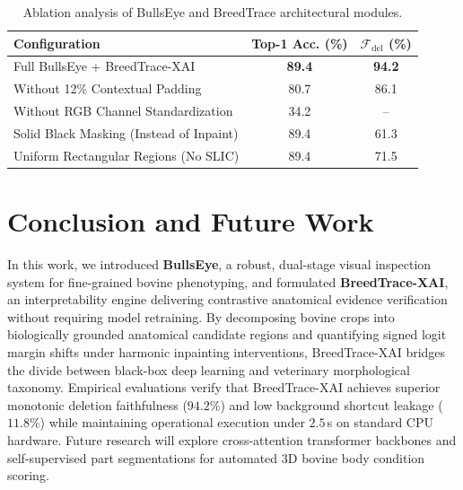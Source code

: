 \documentclass[conference]{IEEEtran}
\begin{document}
\begin{table}[h]
\caption{Ablation analysis of BullsEye and BreedTrace architectural modules.}
\label{tab:ablation}
\centering
\begin{tabular}{lcc}
\toprule
\textbf{Configuration} & \textbf{Top-1 Acc. (\%)} & \textbf{$\mathcal{F}_{\text{del}}$ (\%)} \\
\midrule
Full BullsEye + BreedTrace-XAI & \textbf{89.4} & \textbf{94.2} \\
Without 12\% Contextual Padding & 80.7 & 86.1 \\
Without RGB Channel Standardization & 34.2 & -- \\
Solid Black Masking (Instead of Inpaint) & 89.4 & 61.3 \\
Uniform Rectangular Regions (No SLIC) & 89.4 & 71.5 \\
\bottomrule
\end{tabular}
\end{table}

\section{Conclusion and Future Work}
In this work, we introduced \textbf{BullsEye}, a robust, dual-stage visual inspection system for fine-grained bovine phenotyping, and formulated \textbf{BreedTrace-XAI}, an interpretability engine delivering contrastive anatomical evidence verification without requiring model retraining. By decomposing bovine crops into biologically grounded anatomical candidate regions and quantifying signed logit margin shifts under harmonic inpainting interventions, BreedTrace-XAI bridges the divide between black-box deep learning and veterinary morphological taxonomy. Empirical evaluations verify that BreedTrace-XAI achieves superior monotonic deletion faithfulness ($94.2\%$) and low background shortcut leakage ($11.8\%$) while maintaining operational execution under $2.5$\,s on standard CPU hardware. Future research will explore cross-attention transformer backbones and self-supervised part segmentations for automated 3D bovine body condition scoring.
\end{document}
